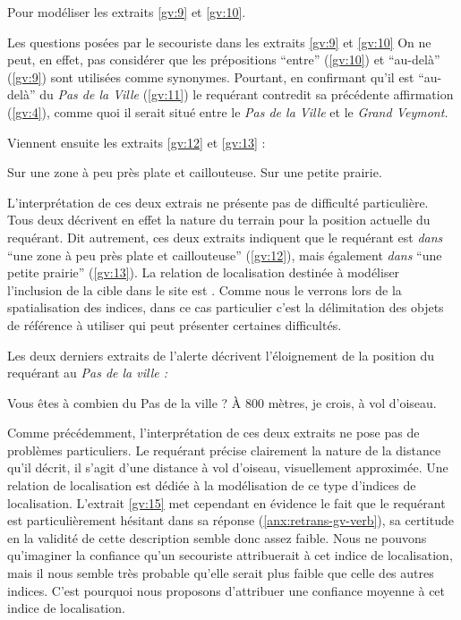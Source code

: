 Pour modéliser les extraits \ref{gv:9} et \ref{gv:10}.

Les questions posées par le secouriste dans les extraits \ref{gv:9} et
\ref{gv:10}
%
On ne peut, en effet, pas considérer que les prépositions
\enquote{entre} (\ref{gv:10}) et \enquote{au-delà} (\ref{gv:9}) sont
utilisées comme synonymes.
%
Pourtant, en confirmant qu'il est \enquote{au-delà} du \emph{Pas de la
  Ville} (\ref{gv:11}) le requérant contredit sa précédente
affirmation (\ref{gv:4}), comme quoi il serait situé entre le
\emph{Pas de la Ville} et le \emph{Grand Veymont.}

Viennent ensuite les extraits \ref{gv:12} et \ref{gv:13} :
%
\begin{dialogue*}
  \Req {} Sur une zone à peu près plate et
  caillouteuse.  Sur une petite prairie.
\end{dialogue*}

L'interprétation de ces deux extrais ne présente pas de difficulté
particulière. Tous deux décrivent en effet la nature du terrain pour
la position actuelle du requérant. Dit autrement, ces deux extraits
indiquent que le requérant est \emph{dans} \enquote{une zone à peu
  près plate et caillouteuse} (\ref{gv:12}), mais également
\emph{dans} \enquote{une petite prairie} (\ref{gv:13}). La relation de
localisation destinée à modéliser l'inclusion de la cible dans le site
est . Comme nous le verrons lors de la
spatialisation des indices, dans ce cas particulier c'est la
délimitation des objets de référence à utiliser qui peut présenter
certaines difficultés.

Les deux derniers extraits de l'alerte décrivent l'éloignement de la
position du requérant au \emph{Pas de la ville :}
%
\begin{dialogue*}
  \Sec {} Vous êtes à combien du Pas de la ville ?
  \Req {} À 800 mètres, je crois, à vol d'oiseau.
\end{dialogue*}

Comme précédemment, l'interprétation de ces deux extraits ne pose pas
de problèmes particuliers. Le requérant précise clairement la nature
de la distance qu'il décrit, il s'agit d'une distance à vol d'oiseau,
visuellement approximée. Une relation de localisation
 est dédiée à
la modélisation de ce type d'indices de localisation. L'extrait
\ref{gv:15} met cependant en évidence le fait que le requérant est
particulièrement hésitant dans sa réponse
(\autoref{anx:retrans-gv-verb}), sa certitude en la validité de cette
description semble donc assez faible. Nous ne pouvons qu'imaginer la
confiance qu'un secouriste attribuerait à cet indice de localisation,
mais il nous semble très probable qu'elle serait plus faible que celle
des autres indices. C'est pourquoi nous proposons d'attribuer une
confiance moyenne à cet indice de localisation.

